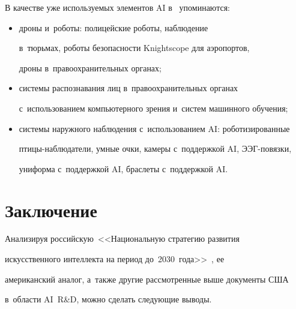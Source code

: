   В качестве уже используемых элементов AI в~\cite{17-bor} упоминаются:


  \begin{itemize}


\item %


 дроны и~роботы: полицейские роботы, наблюдение


в~тюрьмах, роботы безопас\-ности Knightscope для аэропортов,


дроны в~правоохранительных органах;


\item %


системы распознавания лиц в~правоохранительных органах


с~использованием компьютерного зрения и~систем машинного обучения;


\item %


системы наружного наблюдения с~использованием AI: роботизированные


пти\-цы-на\-блю\-да\-те\-ли, умные очки, камеры с~поддержкой AI, ЭЭГ-по\-вяз\-ки,


униформа с~поддержкой AI, браслеты с~поддержкой AI.


  \end{itemize}





\section{Заключение} %





  Анализируя российскую~<<Национальную стратегию развития


искусственного интеллекта на период до~2030~года>>~\cite{3-bor}, ее


американский аналог, а~также другие рас\-смот\-рен\-ные выше документы США


в~области AI~R\&D, можно сделать сле\-ду\-ющие выводы.


